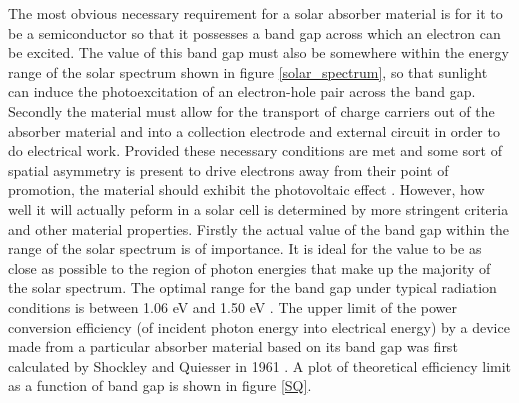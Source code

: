 The most obvious necessary requirement for a solar absorber material is for it to be a semiconductor so that it possesses a band gap across which an electron can be excited. The value of this band gap must also be somewhere within the energy range of the solar spectrum shown in figure \ref{solar_spectrum}, so that sunlight can induce the photoexcitation of an electron-hole pair across the band gap. Secondly the material must allow for the transport of charge carriers out of the absorber material and into a collection electrode and external circuit in order to do electrical work. Provided these necessary conditions are met and some sort of spatial asymmetry is present to drive electrons away from their point of promotion, the material should exhibit the photovoltaic effect \cite{Nelson2}. However, how well it will actually peform in a solar cell is determined by more stringent criteria and other material properties. Firstly the actual value of the band gap within the range of the solar spectrum is of importance. It is ideal for the value to be as close as possible to the region of photon energies that make up the majority of the solar spectrum. The optimal range for the band gap under typical radiation conditions is between 1.06 eV and 1.50 eV \cite{CZTS_book}. The upper limit of the power conversion efficiency (of incident photon energy into electrical energy) by a device made from a particular absorber material based on its band gap was first calculated by Shockley and Quiesser in 1961 \cite{SQ_1961}. A plot of theoretical efficiency limit as a function of band gap is shown in figure \ref{SQ}.

